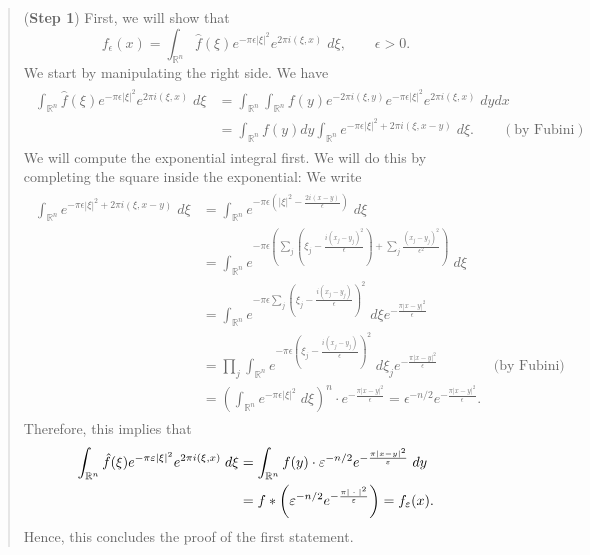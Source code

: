 \documentclass{article}
\begin{document}
\begin{itemize}
{		\begin{quote}
			(\textbf{Step 1}) First, we will show that 
				\begin{equation*}
					f_{\epsilon}(x) = \int_{\mathbb{R}^{n}}\hat{f}(\xi)e^{-\pi \epsilon |\xi|^{2}}e^{2\pi i (\xi, x)}\;d\xi, \qquad \epsilon >0. 
				\end{equation*}
			We start by manipulating the right side. We have 
				\begin{align}
					\begin{split}
						\int_{\mathbb{R}^{n}}\hat{f}(\xi)e^{-\pi \epsilon |\xi|^{2}}e^{2\pi i (\xi, x)}\;d\xi &= \int_{\mathbb{R}^{n}}\int_{\mathbb{R}^{n}}f(y)e^{-2\pi i (\xi, y)}e^{-\pi \epsilon |\xi|^{2}}e^{2\pi i (\xi, x)}\;dy dx \\
						&= \int_{\mathbb{R}^{n}}f(y)dy\int_{\mathbb{R}^{n}}e^{-\pi \epsilon |\xi|^{2} + 2\pi i (\xi, x - y)}\;d\xi. \qquad (\text{by Fubini})
					\end{split}
				\end{align}
			We will compute the exponential integral first. We will do this by completing the square inside the exponential: We write 
				\begin{align}
					\begin{split}
						\int_{\mathbb{R}^{n}}e^{-\pi \epsilon |\xi|^{2} + 2\pi i (\xi, x - y)}\;d\xi  &= \int_{\mathbb{R}^{n}}e^{-\pi \epsilon \left(|\xi|^{2} - \frac{2i(x - y)}{\epsilon}\right)}\;d\xi\\
						&= \int_{\mathbb{R}^{n}}e^{-\pi \epsilon \left(\sum_{j}\left(\xi_{j} - \frac{i(x_{j} - y_{j})^{2}}{\epsilon}\right) + \sum_{j} \frac{(x_{j} - y_{j})^{2}}{\epsilon^{2}}\right)}\;d\xi \\
						&= \int_{\mathbb{R}^{n}}e^{-\pi \epsilon \sum_{j}\left( \xi_{j} - \frac{ i(x_{j} - y_{j})}{\epsilon} \right)^{2}}\;d\xi e^{-\frac{\pi |x - y|^{2}}{\epsilon}} \\
						&= \prod_{j}\int_{\mathbb{R}^{n}}e^{-\pi \epsilon \left(\xi_{j} - \frac{ i(x_{j} - y_{j})}{\epsilon}\right)^{2}}\;d\xi_{j} e^{-\frac{\pi |x - y|^{2}}{\epsilon}} \qquad \qquad \text{(by Fubini)} \\
						&= \left(\int_{\mathbb{R}^{n}}e^{-\pi \epsilon |\xi|^{2}}\;d\xi\right)^{n} \cdot e^{-\frac{\pi |x - y|^{2}}{\epsilon}} = \epsilon^{-n/2}e^{-\frac{\pi|x - y|^{2}}{\epsilon}}. 
					\end{split}
				\end{align}
			Therefore, this implies that 
				\begin{align}
					\begin{split}
						\int_{\mathbb{R}^{n}}\hat{f}(\xi)e^{-\pi \varepsilon |\xi|^{2}}e^{2\pi i (\xi, x)}\;d\xi &= \int_{\mathbb{R}^{n}}f(y) \cdot \varepsilon^{-n/2}e^{-\frac{\pi |x - y|^{2}}{\varepsilon}}\;dy \\
						&= f \ast \left(\varepsilon^{-n/2}e^{-\frac{\pi |\hspace{2pt}\cdot\hspace{2pt}|^{2}}{\varepsilon}}\right) = f_{\varepsilon}(x). 
					\end{split}
				\end{align}
			Hence, this concludes the proof of the first statement. 
			

\end{quote}}
\end{itemize}
\end{document}
